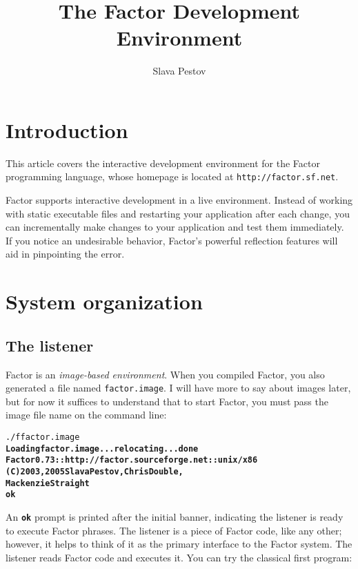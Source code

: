 \documentclass{article}
\begin{document}
\title{The Factor Development Environment}
\author{Slava Pestov}

\maketitle

\tableofcontents

\section{Introduction}

This article covers the interactive development environment for the Factor programming language, whose homepage is located at \texttt{http://factor.sf.net}.

Factor supports interactive development in a live environment. Instead of working with
static executable files and restarting your application after each change, you can
incrementally make changes to your application and test them immediately. If you
notice an undesirable behavior, Factor's powerful reflection features will aid in
pinpointing the error.

\section{System organization}

\subsection{The listener}

Factor is an \emph{image-based environment}. When you compiled Factor, you also generated a file named \texttt{factor.image}. I will have more to say about images later, but for now it suffices to understand that to start Factor, you must pass the image file name on the command line:

\begin{alltt}
./f factor.image
\textbf{Loading factor.image... relocating... done
Factor 0.73 :: http://factor.sourceforge.net :: unix/x86
(C) 2003, 2005 Slava Pestov, Chris Double,
Mackenzie Straight
ok}
\end{alltt}


An \texttt{\textbf{ok}} prompt is printed after the initial banner, indicating the listener is ready to execute Factor phrases. The listener is a piece of Factor code, like any other; however, it helps to think of it as the primary interface to the Factor system. The listener reads Factor code and executes it. You can try the classical first program:
\end{document}
